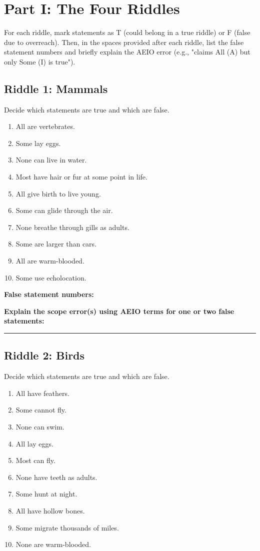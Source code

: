 \documentclass[12pt]{article}
\newcommand{\studentline}{\par\vspace{0.60em}\hrule\vspace{0.64em}}
\begin{document}
\section*{Part I: The Four Riddles}

For each riddle, mark statements as T (could belong in a true riddle) or F (false due to overreach). Then, in the spaces provided after each riddle, list the false statement numbers and briefly explain the AEIO error (e.g., "claims All (A) but only Some (I) is true").

\subsection*{Riddle 1: Mammals}

Decide which statements are true and which are false.

\begin{enumerate}[leftmargin=*, itemsep=0.1em]
\item All are vertebrates.
\item Some lay eggs.
\item None can live in water.
\item Most have hair or fur at some point in life.
\item All give birth to live young.
\item Some can glide through the air.
\item None breathe through gills as adults.
\item Some are larger than cars.
\item All are warm-blooded.
\item Some use echolocation.
\end{enumerate}

\textbf{False statement numbers:} \hrulefill

\textbf{Explain the scope error(s) using AEIO terms for one or two false statements:}\studentline

\Needspace{0.25\textheight}

\subsection*{Riddle 2: Birds}

Decide which statements are true and which are false.

\begin{enumerate}[leftmargin=*, itemsep=0.1em]
\item All have feathers.
\item Some cannot fly.
\item None can swim.
\item All lay eggs.
\item Most can fly.
\item None have teeth as adults.
\item Some hunt at night.
\item All have hollow bones.
\item Some migrate thousands of miles.
\item None are warm-blooded.
\end{enumerate}
\end{document}

